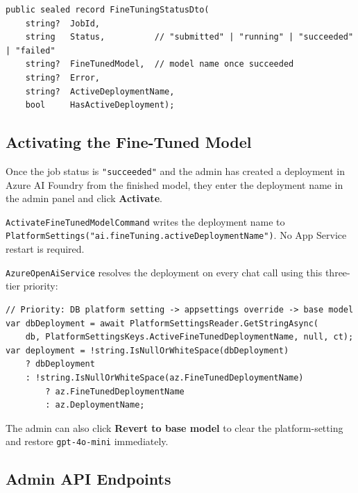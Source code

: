 \documentclass[11pt,a4paper]{article}
\begin{document}
\begin{lstlisting}[language={[Sharp]C},caption={FineTuningStatusDto returned by GET /api/admin/ai/fine-tuning/status}]
public sealed record FineTuningStatusDto(
    string?  JobId,
    string   Status,          // "submitted" | "running" | "succeeded" | "failed"
    string?  FineTunedModel,  // model name once succeeded
    string?  Error,
    string?  ActiveDeploymentName,
    bool     HasActiveDeployment);
\end{lstlisting}

\subsection{Activating the Fine-Tuned Model}

Once the job status is \texttt{"succeeded"} and the admin has created a deployment
in Azure AI Foundry from the finished model, they enter the deployment name in the
admin panel and click \textbf{Activate}.

\texttt{ActivateFineTunedModelCommand} writes the deployment name to
\texttt{PlatformSettings("ai.fineTuning.activeDeploymentName")}.
No App Service restart is required.

\texttt{AzureOpenAiService} resolves the deployment on every chat call using this
three-tier priority:

\begin{lstlisting}[language={[Sharp]C},caption={Deployment selection in AzureOpenAiService.cs}]
// Priority: DB platform setting -> appsettings override -> base model
var dbDeployment = await PlatformSettingsReader.GetStringAsync(
    db, PlatformSettingsKeys.ActiveFineTunedDeploymentName, null, ct);
var deployment = !string.IsNullOrWhiteSpace(dbDeployment)
    ? dbDeployment
    : !string.IsNullOrWhiteSpace(az.FineTunedDeploymentName)
        ? az.FineTunedDeploymentName
        : az.DeploymentName;
\end{lstlisting}

The admin can also click \textbf{Revert to base model} to clear the
platform-setting and restore \texttt{gpt-4o-mini} immediately.

\subsection{Admin API Endpoints}
\end{document}
